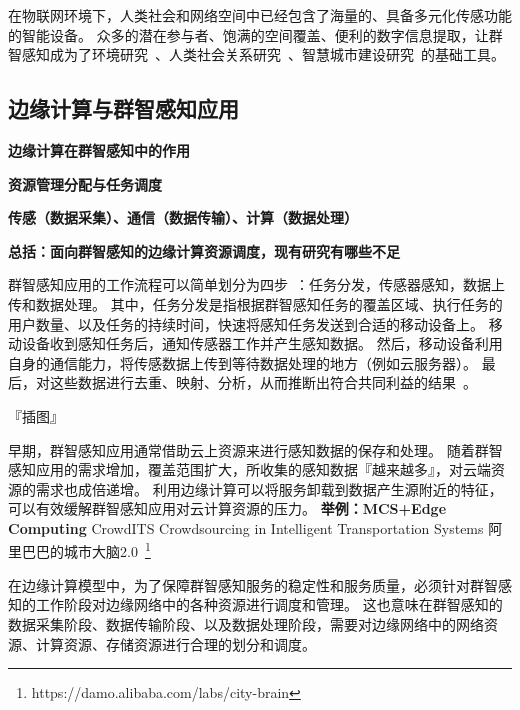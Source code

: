在物联网环境下，人类社会和网络空间中已经包含了海量的、具备多元化传感功能的智能设备。
众多的潜在参与者、饱满的空间覆盖、便利的数字信息提取，让群智感知成为了环境研究~\cite{DBLP:conf/sensys/DuttaAKMMWW09}、人类社会关系研究~\cite{DBLP:conf/globecom/AslIAM13}、智慧城市建设研究~\cite{DBLP:journals/cm/WangZWCHM16}的基础工具。

\subsection{边缘计算与群智感知应用}

\textbf{边缘计算在群智感知中的作用}

\textbf{资源管理分配与任务调度}

\textbf{传感（数据采集）、通信（数据传输）、计算（数据处理）}

\textbf{总括：面向群智感知的边缘计算资源调度，现有研究有哪些不足}

群智感知应用的工作流程可以简单划分为四步~\cite{zh_cn:shi}：任务分发，传感器感知，数据上传和数据处理。
其中，任务分发是指根据群智感知任务的覆盖区域、执行任务的用户数量、以及任务的持续时间，快速将感知任务发送到合适的移动设备上。
移动设备收到感知任务后，通知传感器工作并产生感知数据。
然后，移动设备利用自身的通信能力，将传感数据上传到等待数据处理的地方（例如云服务器）。
最后，对这些数据进行去重、映射、分析，从而推断出符合共同利益的结果~\cite{DBLP:journals/cm/GantiYL11}。

『插图』

早期，群智感知应用通常借助云上资源来进行感知数据的保存和处理。
随着群智感知应用的需求增加，覆盖范围扩大，所收集的感知数据『越来越多』，对云端资源的需求也成倍递增。
利用边缘计算可以将服务卸载到数据产生源附近的特征，可以有效缓解群智感知应用对云计算资源的压力。
\textbf{举例：MCS+Edge Computing}
CrowdITS Crowdsourcing in Intelligent Transportation Systems
阿里巴巴的城市大脑2.0~\footnote{https://damo.alibaba.com/labs/city-brain}

在边缘计算模型中，为了保障群智感知服务的稳定性和服务质量，必须针对群智感知的工作阶段对边缘网络中的各种资源进行调度和管理。
这也意味在群智感知的数据采集阶段、数据传输阶段、以及数据处理阶段，需要对边缘网络中的网络资源、计算资源、存储资源进行合理的划分和调度。



